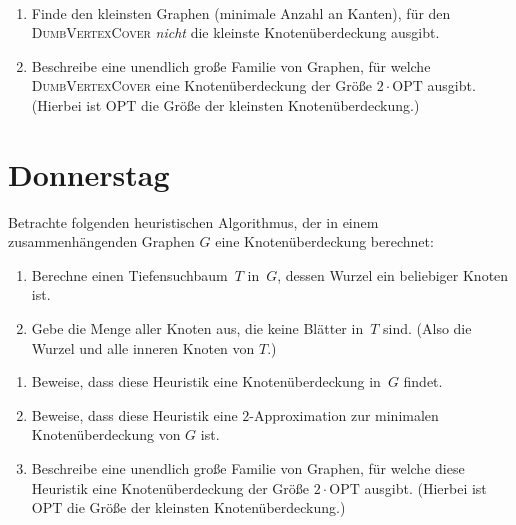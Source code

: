 \documentclass{uebung_cs}
\begin{document}
\begin{exercise}\
	\begin{enumerate}
		\item Finde den kleinsten Graphen (minimale Anzahl an Kanten), für den \textsc{DumbVertexCover} \emph{nicht} die kleinste Knotenüberdeckung ausgibt.
		\item Beschreibe eine unendlich große Familie von Graphen, für welche \textsc{DumbVertexCover} eine Knotenüberdeckung der Größe $2 \cdot \mathrm{OPT}$ ausgibt.
		(Hierbei ist $\mathrm{OPT}$ die Größe der kleinsten Knotenüberdeckung.)
	\end{enumerate}
\end{exercise}

\section*{Donnerstag}


\begin{exercise}
	Betrachte folgenden heuristischen Algorithmus, der in einem zusammenhängenden Graphen $G$ eine Knotenüberdeckung berechnet: 
	\begin{enumerate}[1.,leftmargin=5em]
		\item
		Berechne einen Tiefensuchbaum~$T$ in~$G$, dessen Wurzel ein beliebiger Knoten ist.
		\item
		Gebe die Menge aller Knoten aus, die keine Blätter in~$T$ sind. (Also die Wurzel und alle inneren Knoten von $T$.)
	\end{enumerate}
	\begin{enumerate}
		\item Beweise, dass diese Heuristik eine Knotenüberdeckung in~$G$ findet.
		\item Beweise, dass diese Heuristik eine $2$-Approximation zur minimalen Knotenüberdeckung von $G$ ist.
		\item Beschreibe eine unendlich große Familie von Graphen, für welche diese Heuristik eine Knotenüberdeckung der Größe $2 \cdot \mathrm{OPT}$ ausgibt.
		(Hierbei ist $\mathrm{OPT}$ die Größe der kleinsten Knotenüberdeckung.)
	\end{enumerate}
\end{exercise}
\end{document}
